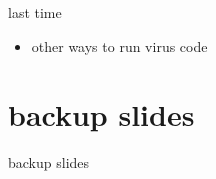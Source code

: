 \date{}
\title{}
\date{}

\begin{frame}
    \titlepage
\end{frame}

\begin{frame}{last time}
    \begin{itemize}
    \item other ways to run virus code
    \end{itemize}
\end{frame}



\section{backup slides}
\begin{frame}{backup slides}
\end{frame}


